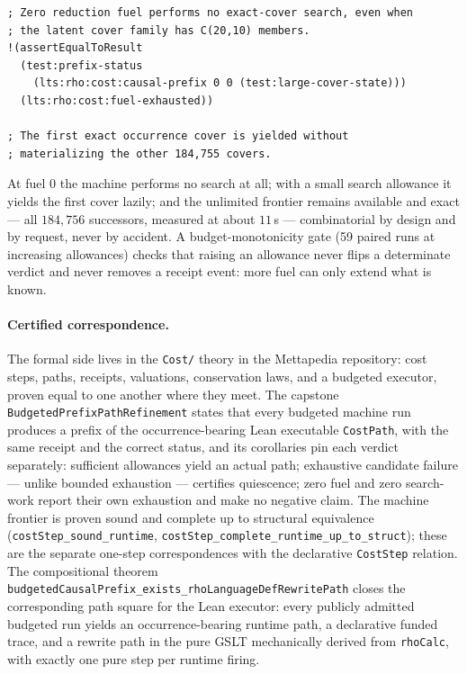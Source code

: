 \documentclass[11pt]{article}
\newcommand{\code}[1]{\texttt{#1}}
\begin{document}
\begin{lstlisting}
; Zero reduction fuel performs no exact-cover search, even when
; the latent cover family has C(20,10) members.
!(assertEqualToResult
  (test:prefix-status
    (lts:rho:cost:causal-prefix 0 0 (test:large-cover-state)))
  (lts:rho:cost:fuel-exhausted))

; The first exact occurrence cover is yielded without
; materializing the other 184,755 covers.
\end{lstlisting}

\noindent
At fuel $0$ the machine performs no search at all; with a small search allowance it yields
the first cover lazily; and the unlimited frontier remains available and exact --- all
$184{,}756$ successors, measured at about $11$\,s --- combinatorial by design and by
request, never by accident. A budget-monotonicity gate (59 paired runs at increasing
allowances) checks that raising an allowance never flips a determinate verdict and never
removes a receipt event: more fuel can only extend what is known.

\paragraph{Certified correspondence.} The formal side lives in the \code{Cost/}
theory in the Mettapedia repository: cost steps, paths, receipts, valuations,
conservation laws, and a budgeted executor, proven equal to one another where they meet.
The capstone \code{BudgetedPrefixPathRefinement} states that every budgeted machine run
produces a prefix of the occurrence-bearing Lean executable \code{CostPath}, with
the same receipt and the correct status,
and its corollaries pin each verdict separately: sufficient allowances yield an actual
path; exhaustive candidate failure --- unlike bounded exhaustion --- certifies quiescence;
zero fuel and zero search-work report their own exhaustion and make no negative claim. The
machine frontier is proven sound and complete up to structural equivalence
(\code{costStep\_sound\_runtime},
\code{costStep\_complete\_runtime\_up\_to\_struct}); these are the separate
one-step correspondences with the declarative \code{CostStep} relation.
The compositional theorem
\code{budgetedCausalPrefix\_exists\_rhoLanguageDefRewritePath} closes the
corresponding path square for the Lean executor: every publicly admitted
budgeted run yields an occurrence-bearing runtime path, a declarative funded
trace, and a rewrite path in the pure GSLT mechanically derived from
\code{rhoCalc}, with exactly one pure step per runtime firing.
\end{document}
